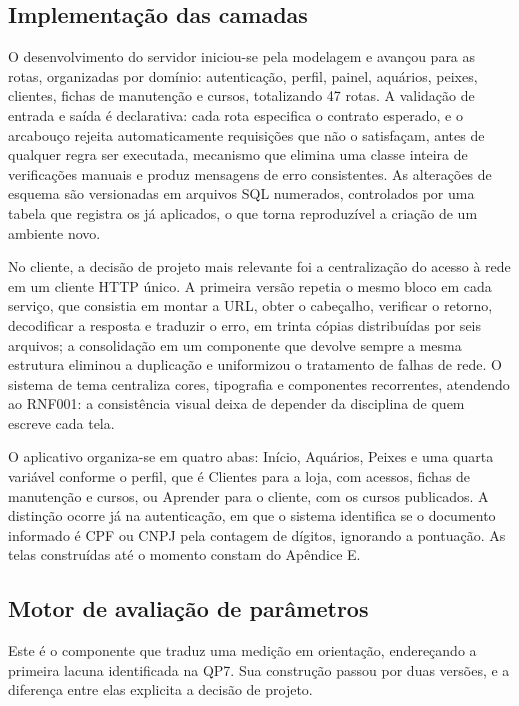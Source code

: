 \documentclass[12pt,oneside,a4paper,brazilian]{abntex2}
\begin{document}
\subsection{Implementação das camadas}
O desenvolvimento do servidor iniciou-se pela modelagem e avançou para as rotas, organizadas por domínio: autenticação, perfil, painel, aquários, peixes, clientes, fichas de manutenção e cursos, totalizando 47 rotas. A validação de entrada e saída é declarativa: cada rota especifica o contrato esperado, e o arcabouço rejeita automaticamente requisições que não o satisfaçam, antes de qualquer regra ser executada, mecanismo que elimina uma classe inteira de verificações manuais e produz mensagens de erro consistentes. As alterações de esquema são versionadas em arquivos SQL numerados, controlados por uma tabela que registra os já aplicados, o que torna reproduzível a criação de um ambiente novo.

No cliente, a decisão de projeto mais relevante foi a centralização do acesso à rede em um cliente HTTP único. A primeira versão repetia o mesmo bloco em cada serviço, que consistia em montar a URL, obter o cabeçalho, verificar o retorno, decodificar a resposta e traduzir o erro, em trinta cópias distribuídas por seis arquivos; a consolidação em um componente que devolve sempre a mesma estrutura eliminou a duplicação e uniformizou o tratamento de falhas de rede. O sistema de tema centraliza cores, tipografia e componentes recorrentes, atendendo ao RNF001: a consistência visual deixa de depender da disciplina de quem escreve cada tela.

O aplicativo organiza-se em quatro abas: Início, Aquários, Peixes e uma quarta variável conforme o perfil, que é Clientes para a loja, com acessos, fichas de manutenção e cursos, ou Aprender para o cliente, com os cursos publicados. A distinção ocorre já na autenticação, em que o sistema identifica se o documento informado é CPF ou CNPJ pela contagem de dígitos, ignorando a pontuação. As telas construídas até o momento constam do Apêndice E.


\subsection{Motor de avaliação de parâmetros}
Este é o componente que traduz uma medição em orientação, endereçando a primeira lacuna identificada na QP7. Sua construção passou por duas versões, e a diferença entre elas explicita a decisão de projeto.
\end{document}

